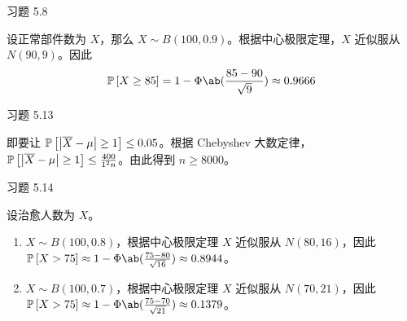 \begin{problem}
    习题 5.8
    \begin{solution}
        设正常部件数为 $X$，那么 $X \sim B(100, 0.9)$。根据中心极限定理，$X$ 近似服从 $N(90, 9)$。因此
        $$
        \prob{X \ge 85} = 1 - \Phi\ab(\frac{85 - 90}{\sqrt{9}}) \approx 0.9666
        $$
    \end{solution}
\end{problem}

\begin{problem}
    习题 5.13
    \begin{solution}
        即要让 $\operatorname{\mathbb{P}}\left[\abs{\overline{X} - \mu} \ge 1\right] \le 0.05$。根据 Chebyshev 大数定律，$\operatorname{\mathbb{P}}\left[\abs{\overline{X} - \mu} \ge 1\right] \le \frac{400}{1^2 n}$。由此得到 $n \ge 8000$。
    \end{solution}
\end{problem}

\begin{problem}
    习题 5.14
    \begin{solution}
        设治愈人数为 $X$。

        \begin{enumerate}
            \item[\textbf{1)}] $X \sim B(100, 0.8)$，根据中心极限定理 $X$ 近似服从 $N(80, 16)$，因此 $\prob{X > 75} \approx 1 - \Phi\ab(\frac{75 - 80}{\sqrt{16}}) \approx 0.8944$。
            \item[\textbf{2)}] $X \sim B(100, 0.7)$，根据中心极限定理 $X$ 近似服从 $N(70, 21)$，因此 $\prob{X > 75} \approx 1 - \Phi\ab(\frac{75 - 70}{\sqrt{21}}) \approx 0.1379$。
        \end{enumerate}
    \end{solution}
\end{problem}